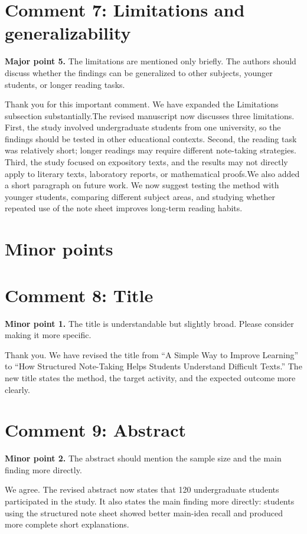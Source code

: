 \section*{Comment 7: Limitations and generalizability}
\begin{commentbox}
\textbf{Major point 5.} The limitations are mentioned only briefly. The authors should discuss whether the findings can be generalized to other subjects, younger students, or longer reading tasks.
\end{commentbox}
\begin{replybox}
Thank you for this important comment. We have expanded the Limitations subsection substantially.The revised manuscript now discusses three limitations. First, the study involved undergraduate students from one university, so the findings should be tested in other educational contexts. Second, the reading task was relatively short; longer readings may require different note-taking strategies. Third, the study focused on expository texts, and the results may not directly apply to literary texts, laboratory reports, or mathematical proofs.We also added a short paragraph on future work. We now suggest testing the method with younger students, comparing different subject areas, and studying whether repeated use of the note sheet improves long-term reading habits.
\end{replybox}
\section*{Minor points}
\section*{Comment 8: Title}
\begin{commentbox}
\textbf{Minor point 1.} The title is understandable but slightly broad. Please consider making it more specific.
\end{commentbox}
\begin{replybox}
Thank you. We have revised the title from ``A Simple Way to Improve Learning'' to ``How Structured Note-Taking Helps Students Understand Difficult Texts.'' The new title states the method, the target activity, and the expected outcome more clearly.
\end{replybox}
\section*{Comment 9: Abstract}
\begin{commentbox}
\textbf{Minor point 2.} The abstract should mention the sample size and the main finding more directly.
\end{commentbox}
\begin{replybox}
We agree. The revised abstract now states that 120 undergraduate students participated in the study. It also states the main finding more directly: students using the structured note sheet showed better main-idea recall and produced more complete short explanations.
\end{replybox}
